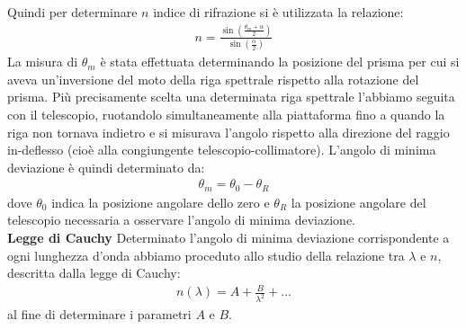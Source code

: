 \documentclass[a4paper]{article}
\begin{document}
Quindi per determinare $n$ indice di rifrazione si è utilizzata la relazione:
\begin{align}
    n= \frac{\sin(\frac{\theta_m + \alpha}{2})}{\sin(\frac{\alpha}{2})}
\label{eq:indice di rifrazione}
\end{align}
La misura di $\theta_m$ è stata effettuata determinando la posizione del prisma per cui si aveva un'inversione del moto della riga spettrale rispetto alla rotazione del prisma. Più precisamente scelta una determinata riga spettrale l'abbiamo seguita con il telescopio, ruotandolo simultaneamente alla piattaforma fino a quando la riga non tornava indietro e si misurava l'angolo rispetto alla direzione del raggio in-deflesso (cioè alla congiungente telescopio-collimatore). L'angolo di minima deviazione è quindi determinato da: 
\begin{align}
    \theta_m = \theta_0-\theta_R
\label{eq:posizione zero}
\end{align}
dove $\theta_0$ indica la posizione angolare dello zero e $\theta_R$ la posizione angolare del telescopio necessaria a osservare l'angolo di minima deviazione.
\newline\\
\textbf{Legge di Cauchy} \newline
Determinato l'angolo di minima deviazione corrispondente a ogni lunghezza d'onda abbiamo proceduto allo studio della relazione tra $\lambda$ e $n$, descritta dalla legge di Cauchy:
\begin{align}
    n(\lambda) = A + \frac{B}{\lambda^2} + ...
\label{eq:Cauchy}
\end{align}
al fine di determinare i parametri $A$ e $B$.
\end{document}
